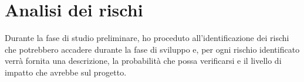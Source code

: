 
\section{Analisi dei rischi}
Durante la fase di studio preliminare, ho proceduto all'identificazione dei rischi che potrebbero accadere durante la fase di sviluppo e, per ogni rischio identificato verrà fornita una descrizione, la probabilità che possa verificarsi e il livello di impatto che avrebbe sul progetto. \\



